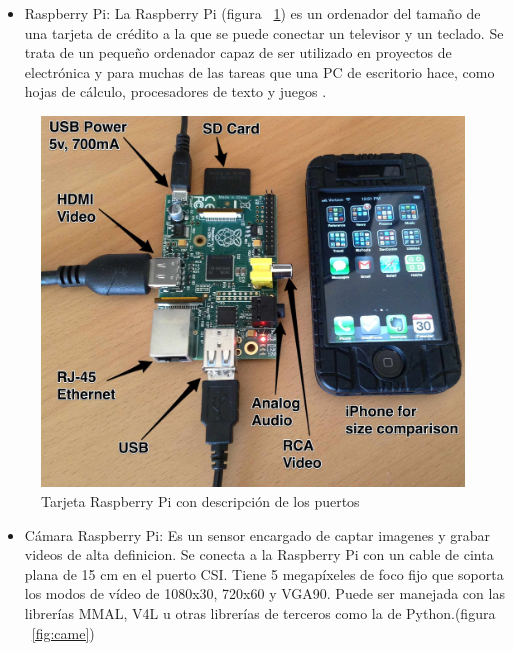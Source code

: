 \begin{itemize}
\item Raspberry Pi: La Raspberry Pi (figura ~\ref{fig:Raspe}) es un ordenador del tamaño de una tarjeta de crédito a la que se puede conectar un televisor y un teclado. Se trata de un pequeño ordenador capaz de ser utilizado en proyectos de electrónica y para muchas de las tareas que una PC de escritorio hace, como hojas de cálculo, procesadores de texto y juegos \cite{raspberry}. 

\end{itemize}

\begin{figure}[hbtp]
\centering

\includegraphics[scale=0.1]{imagenes/raspberry_pi_iphone.jpg}
\caption{Tarjeta Raspberry Pi con descripción de los puertos}
\label{fig:Raspe}
\end{figure}

\begin{itemize}
\item C\'amara Raspberry Pi: Es un sensor encargado de captar imagenes y grabar videos de alta definicion. Se conecta a la Raspberry Pi con un cable de cinta plana de 15 cm en el puerto CSI. Tiene 5 megapíxeles de foco fijo que soporta los modos de vídeo de 1080x30, 720x60 y VGA90. Puede ser manejada con las librerías MMAL, V4L u otras librerías de terceros como la de Python.(figura ~\ref{fig:came}) \cite{raspberrycam} %

\end{itemize}

